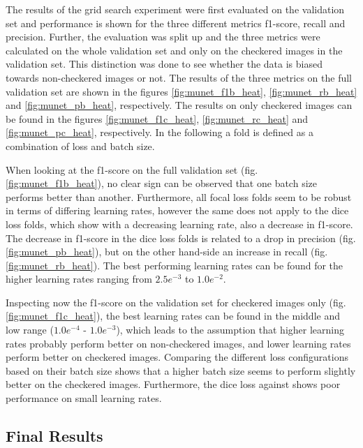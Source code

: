 The results of the grid search experiment were first evaluated on the validation set and performance is shown for the three different metrics f1-score, recall and precision.
Further, the evaluation was split up and the three metrics were calculated on the whole validation set and only on the checkered images in the validation set.
This distinction was done to see whether the data is biased towards non-checkered images or not.
The results of the three metrics on the full validation set are shown in the figures \ref{fig:munet_f1b_heat}, \ref{fig:munet_rb_heat} and \ref{fig:munet_pb_heat}, respectively.
The results on only checkered images can be found in the figures \ref{fig:munet_f1c_heat}, \ref{fig:munet_rc_heat} and \ref{fig:munet_pc_heat}, respectively.
In the following a fold is defined as a combination of loss and batch size.

When looking at the f1-score on the full validation set (fig. \ref{fig:munet_f1b_heat}), no clear sign can be observed that one batch size performs better than another.
Furthermore, all focal loss folds seem to be robust in terms of differing learning rates, however the same does not apply to the dice loss folds, which show with a decreasing learning rate, also a decrease in f1-score.
The decrease in f1-score in the dice loss folds is related to a drop in precision (fig. \ref{fig:munet_pb_heat}), but on the other hand-side an increase in recall (fig. \ref{fig:munet_rb_heat}).
The best performing learning rates can be found for the higher learning rates ranging from $2.5e^{-3}$ to $1.0e^{-2}$.

Inspecting now the f1-score on the validation set for checkered images only (fig. \ref{fig:munet_f1c_heat}), the best learning rates can be found in the middle and low range ($1.0e^{-4}$ - $1.0e^{-3}$), which leads to the assumption that higher learning rates probably perform better on non-checkered images, and lower learning rates perform better on checkered images.
Comparing the different loss configurations based on their batch size shows that a higher batch size seems to perform slightly better on the checkered images.
Furthermore, the dice loss against shows poor performance on small learning rates.

\subsection{Final Results}
\label{sec:munet_final}

